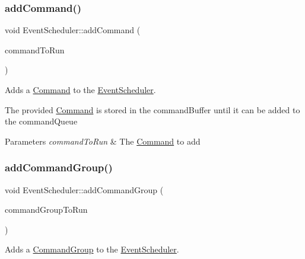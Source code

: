 \subsubsection{\texorpdfstring{addCommand()}{addCommand()}}
{\footnotesize\ttfamily void Event\+Scheduler\+::add\+Command (\begin{DoxyParamCaption}\item[{\mbox{\hyperlink{classlib_iterative_robot_1_1_command}{Command}} $\ast$}]{command\+To\+Run }\end{DoxyParamCaption})}



Adds a \mbox{\hyperlink{classlib_iterative_robot_1_1_command}{Command}} to the \mbox{\hyperlink{classlib_iterative_robot_1_1_event_scheduler}{Event\+Scheduler}}. 

The provided \mbox{\hyperlink{classlib_iterative_robot_1_1_command}{Command}} is stored in the command\+Buffer until it can be added to the command\+Queue


\begin{DoxyParams}{Parameters}
{\em command\+To\+Run} & The \mbox{\hyperlink{classlib_iterative_robot_1_1_command}{Command}} to add \\
\hline
\end{DoxyParams}
\mbox{\label{classlib_iterative_robot_1_1_event_scheduler_a24dfdf47117ffa162f74042345f57d94}} 
\subsubsection{\texorpdfstring{addCommandGroup()}{addCommandGroup()}}
{\footnotesize\ttfamily void Event\+Scheduler\+::add\+Command\+Group (\begin{DoxyParamCaption}\item[{\mbox{\hyperlink{classlib_iterative_robot_1_1_command_group}{Command\+Group}} $\ast$}]{command\+Group\+To\+Run }\end{DoxyParamCaption})}



Adds a \mbox{\hyperlink{classlib_iterative_robot_1_1_command_group}{Command\+Group}} to the \mbox{\hyperlink{classlib_iterative_robot_1_1_event_scheduler}{Event\+Scheduler}}. 

